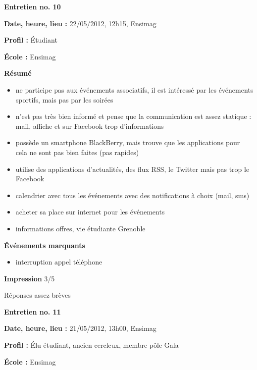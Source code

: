 \documentclass[a4paper, 11px]{article}
\begin{document}
\vspace{.3cm}

 \textbf {\large Entretien no. 10}

\textbf{Date, heure, lieu : }
22/05/2012, 12h15, Ensimag

\textbf{Profil : }
Étudiant

\textbf{École : }
Ensimag

\textbf{Résumé}
	\begin{itemize}
		\item ne participe pas aux événements associatifs, il est intéressé par les événements sportifs, mais pas par les soirées
		\item n'est pas très bien informé et pense que la communication est assez statique : mail, affiche et sur Facebook trop d'informations
		\item possède un smartphone BlackBerry, mais trouve que les applications pour cela ne sont pas bien faites (pas rapides)
		\item utilise des applications d'actualités, des flux RSS, le Twitter mais pas trop le Facebook
		\item calendrier avec tous les événements avec des notifications à choix (mail, sms)
		\item acheter sa place sur internet pour les événements
		\item informations offres, vie étudiante Grenoble
	\end{itemize}

\vspace{.25cm}
\textbf{Événements marquants}
	\begin{itemize}
		\item interruption appel téléphone
	\end{itemize}
\vspace{.25cm}

\textbf{Impression}
3/5

Réponses assez brèves


\vspace{.3cm}

 \textbf {\large Entretien no. 11}

\textbf{Date, heure, lieu : }
21/05/2012, 13h00, Ensimag

\textbf{Profil : }
Élu étudiant, ancien cercleux, membre pôle Gala

\textbf{École : }
Ensimag
\end{document}
